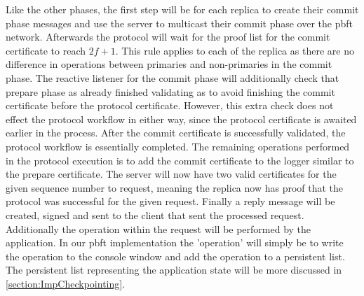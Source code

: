 Like the other phases, the first step will be for each replica to create their commit phase messages and use the server to multicast their commit phase over the \ac{pbft} network. Afterwards the protocol will wait for the proof list for the commit certificate to reach $2f+1$. This rule applies to each of the replica as there are no difference in operations between primaries and non-primaries in the commit phase. The reactive listener for the commit phase will additionally check that prepare phase as already finished validating as to avoid finishing the commit certificate before the protocol certificate. However, this extra check does not effect the protocol workflow in either way, since the protocol certificate is awaited earlier in the process. After the commit certificate is successfully validated, the protocol workflow is essentially completed. The remaining operations performed in the protocol execution is to add the commit certificate to the logger similar to the prepare certificate. The server will now have two valid certificates for the given sequence number to request, meaning the replica now has proof that the protocol was successful for the given request. Finally a reply message will be created, signed and sent to the client that sent the processed request. Additionally the operation within the request will be performed by the application. In our \ac{pbft} implementation the 'operation' will simply be to write the operation to the console window and add the operation to a persistent list. The persistent list representing the application state will be more discussed in \autoref{section:ImpCheckpointing}.
\fi

